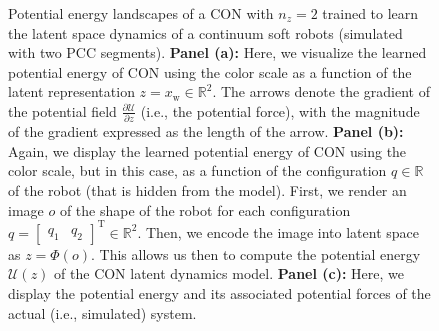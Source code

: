 \begin{figure}[ht]
    \caption{Potential energy landscapes of a \gls{CON} with $n_z=2$ trained to learn the latent space dynamics of a continuum soft robots (simulated with two \gls{PCC} segments). \textbf{Panel (a):} Here, we visualize the learned potential energy of \gls{CON} using the color scale as a function of the latent representation $z = x_\mathrm{w} \in \mathbb{R}^2$. The arrows denote the gradient of the potential field $\frac{\partial \mathcal{U}}{\partial z}$ (i.e., the potential force), with the magnitude of the gradient expressed as the length of the arrow. \textbf{Panel (b):} Again, we display the learned potential energy of \gls{CON} using the color scale, but in this case, as a function of the configuration $q \in \mathbb{R}$ of the robot (that is hidden from the model). First, we render an image $o$ of the shape of the robot for each configuration $q = \begin{bmatrix}
        q_1 & q_2
    \end{bmatrix}^\mathrm{T} \in \mathbb{R}^2$. Then, we encode the image into latent space as $z = \Phi(o)$. This allows us then to compute the potential energy $\mathcal{U}(z)$ of the \gls{CON} latent dynamics model. \textbf{Panel (c):} Here, we display the potential energy and its associated potential forces of the actual (i.e., simulated) system.}
\end{figure}

